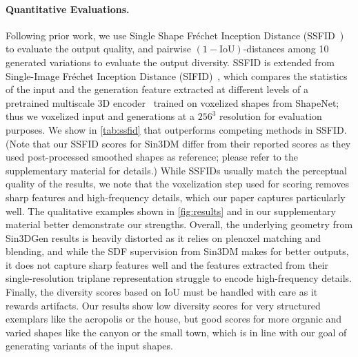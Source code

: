 \vspace*{-4mm}
\paragraph{Quantitative Evaluations.}
Following prior work, we use Single Shape Fréchet Inception Distance (SSFID~\cite{wu2022learning}) to evaluate the output quality, and pairwise \((1\!-\!\text{IoU})\)-distances among 10 generated variations to evaluate the output diversity.
SSFID is extended from Single-Image Fréchet Inception Distance (SIFID)~\cite{shaham2019singan}, which compares the statistics of the input and the generation feature extracted at different levels of a pretrained multiscale 3D encoder~\cite{chen2021decor} trained on voxelized shapes from ShapeNet;
thus we voxelized input and generations at a $256^3$ resolution for evaluation purposes. We show in \cref{tab:ssfid} that \ourmethod{} outperforms competing methods in SSFID. (Note that our SSFID scores for Sin3DM differ from their reported scores as they used post-processed smoothed shapes as reference; please refer to the supplementary material for details.)  
While SSFIDs usually match the perceptual quality of the results, we note that the voxelization step used for scoring removes sharp features and high-frequency details, which our paper captures particularly well. 
The qualitative examples shown in \cref{fig:results} and in our supplementary material better demonstrate our strengths. Overall, the underlying geometry from Sin3DGen results is heavily distorted as it relies on plenoxel matching and blending, and while the SDF supervision from Sin3DM makes for better outputs, it does not capture sharp features well and the features extracted from their single-resolution triplane representation struggle to encode high-frequency details.
Finally, the diversity scores based on IoU must be handled with care as it rewards artifacts. Our results show low diversity scores for very structured exemplars like the acropolis or the house, but good scores for more organic and varied shapes like the canyon or the small town, which is in line with our goal of generating variants of the input shapes. 

